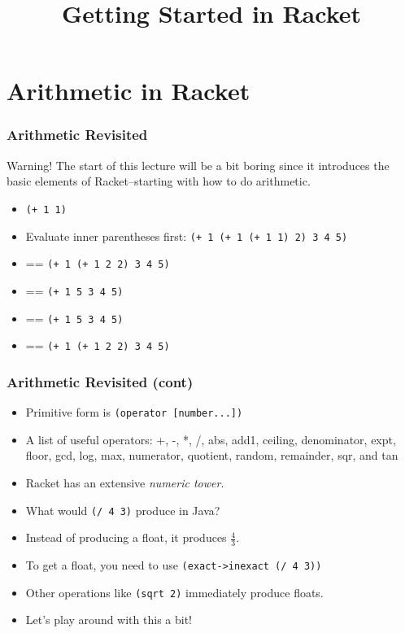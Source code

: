 \documentclass{beamer}
\title{Getting Started in Racket}
\begin{document}
\begin{frame}
\titlepage
\end{frame}

\section{Arithmetic in Racket}
\begin{frame}
  \frametitle{Arithmetic Revisited}
  Warning! The start of this lecture will be a bit boring since it introduces
  the basic elements of Racket--starting with how to do arithmetic.
  \begin{itemize}
  \item<2-> \texttt{(+ 1 1)}
  \item<3-> Evaluate inner parentheses first: \texttt{(+ 1 (+ 1 (+ 1 1) 2) 3 4 5)}
  \item<4-> == \texttt{(+ 1 (+ 1 2 2) 3 4 5)}
  \item<5-> == \texttt{(+ 1 5 3 4 5)}
  \item<6-> == \texttt{(+ 1 5 3 4 5)}
  \item<7-> == \texttt{(+ 1 (+ 1 2 2) 3 4 5)}
  \end{itemize}
\end{frame}

\begin{frame}
  \frametitle{Arithmetic Revisited (cont)}
  \begin{itemize}
  \item<1-> Primitive form is \texttt{(operator [number...])}
  \item<2-> A list of useful operators:  +, -, *, /, abs, add1, ceiling, denominator, expt, floor, gcd, log, max, numerator, quotient, random, remainder, sqr, and tan
  \item<3-> Racket has an extensive \emph{numeric tower}.
  \item<4-> What would \texttt{(/ 4 3)} produce in Java?
  \item<5-> Instead of producing a float, it produces $\frac{4}{3}$.
  \item<6-> To get a float, you need to use \texttt{(exact->inexact (/ 4 3))}
  \item<7-> Other operations like \texttt{(sqrt 2)} immediately produce floats.
  \item<8-> Let's play around with this a bit!
  \end{itemize}
\end{frame}
\end{document}
